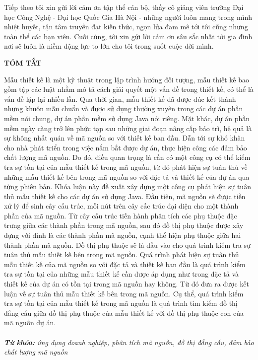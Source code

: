 \documentclass[12pt]{report}
\begin{document}
\noindent Tiếp theo tôi xin gửi lời cảm ơn tập thể cán bộ, thầy cô giảng viên trường Đại học Công Nghệ - Đại học Quốc Gia Hà Nội - những người luôn mang trong mình nhiệt huyết, tận tâm truyền đạt kiến thức, ngọn lửa đam mê tới tôi cũng nhưng toàn thể các bạn viên. Cuối cùng, tôi xin gửi lời cảm ơn sâu sắc nhất tới gia đình nơi sẽ luôn là niềm động lực to lớn cho tôi trong suốt cuộc đời mình.

	
\newpage
\begin{center}
	\textbf{\large TÓM TẮT}
\end{center}
Mẫu thiết kế là một kỹ thuật trong lập trình hướng đối tượng, mẫu thiết kế bao gồm tập các luật nhằm mô tả cách giải quyết một vấn đề trong thiết kế, có thể là vấn đề lặp lại nhiều lần. Qua thời gian, mẫu thiết kế đã được đúc kết thành những khuôn mẫu chuẩn và được sử dụng thường xuyên trong các dự án phần mềm nói chung, dự án phần mềm sử dụng Java nói riêng. Mặt khác, dự án phần mềm ngày càng trở lên phức tạp sau những giai đoạn nâng cấp bảo trì, hệ quả là sự không nhất quán về mã nguồn so với thiết kế ban đầu. Dẫn tới sự khó khăn cho nhà phát triển trong việc nắm bắt được dự án, thực hiện công các đảm bảo chất lượng mã nguồn. Do đó, điều quan trọng là cần có một công cụ có thể kiểm tra sự tồn tại của mẫu thiết kế trong mã nguồn, từ đó phát hiện sự tuân thủ về những mẫu thiết kế bên trong mã nguồn so với đặc tả và thiết kế của dự án qua từng phiên bản. Khóa luận này đề xuất xây dựng một công cụ phát hiện sự tuân thủ mẫu thiết kế cho các dự án sử dụng Java. Đầu tiên, mã nguồn sẽ được tiền xử lý để sinh cây cấu trúc, mỗi nút trên cây cấc trúc đại diện cho một thành phần của mã nguồn. Từ cây cấu trúc tiến hành phân tích các phụ thuộc đặc trưng giữa các thành phần trong mã nguồn, sau đó đồ thị phụ thuộc được xây dựng với đỉnh là các thành phần mã nguồn, cạnh thể hiện phụ thuộc giữa hai thành phần mã nguồn. Đồ thị phụ thuộc sẽ là đầu vào cho quá trình kiểm tra sự tuân thủ mẫu thiết kế bên trong mã nguồn. Quá trình phát hiện sự tuân thủ mẫu thiết kế của mã nguồn so với đặc tả và thiết kế ban đầu là quá trình kiểm tra sự tồn tại của những mẫu thiết kế cần được áp dụng như trong đặc tả và thiết kế của dự án có tồn tại trong mã nguồn hay không. Từ đó đưa ra được kết luận về sự tuân thủ mẫu thiết kế bên trong mã nguồn. Cụ thể, quá trình kiểm tra sự tồn tại của mẫu thiết kế trong mã nguồn là quá trình tìm kiếm đồ thị đẳng cấu giữa đồ thị phụ thuộc của mẫu thiết kế với đồ thị phụ thuộc con của mã nguồn dự án.\\\\
\noindent \textit{\textbf{Từ khóa:} ứng dụng doanh nghiệp, phân tích mã nguồn, đồ thị đẳng cấu, đảm bảo chất lượng mã nguồn}
\end{document}
